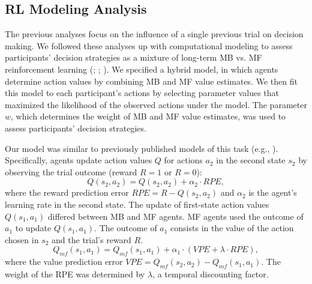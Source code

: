\documentclass[11pt]{article} %
\begin{document}
\subsection{RL Modeling Analysis}
The previous analyses focus on the influence of a single previous trial on decision making. We followed these analyses up with computational modeling to assess participants' decision strategies as a mixture of long-term MB vs. MF reinforcement learning (\cite{akam_simple_2015}; \cite{daw_model-based_2011}; \cite{sutton_reinforcement_2017}). We specified a hybrid model, in which agents determine action values by combining MB and MF value estimates. We then fit this model to each participant's actions by selecting parameter values that maximized the likelihood of the observed actions under the model. The parameter $w$, which determines the weight of MB and MF value estimates, was used to assess participants' decision strategies.

Our model was similar to previously published models of this task (e.g., \cite{wunderlich_dopamine_2012}). Specifically, agents update action values $Q$ for actions $a_{2}$ in the second state $s_{2}$ by observing the trial outcome (reward $R = 1$ or $R = 0$):
%
\begin{equation}
Q(s_{2}, a_{2}) = Q(s_{2}, a_{2}) + \alpha_{2} \cdot RPE,
\end{equation}
%
where the reward prediction error $RPE = R - Q(s_{2}, a_{2})$ and $\alpha_{2}$ is the agent's learning rate in the second state. The update of first-state action values $Q(s_{1}, a_{1})$ differed between MB and MF agents. MF agents used the outcome of $a_{1}$ to update $Q(s_{1}, a_{1})$. The outcome of $a_{1}$ consists in the value of the action chosen in $s_{2}$ and the trial's reward $R$.
%
\begin{equation}
Q_{mf}(s_{1}, a_{1}) = Q_{mf}(s_{1}, a_{1}) + \alpha_{1} \cdot (VPE + \lambda \cdot RPE),
\end{equation}
%
where the value prediction error $VPE = Q_{mf}(s_{2}, a_{2}) - Q_{mf}(s_{1}, a_{1})$. The weight of the RPE was determined by $\lambda$, a temporal discounting factor.
\end{document}
